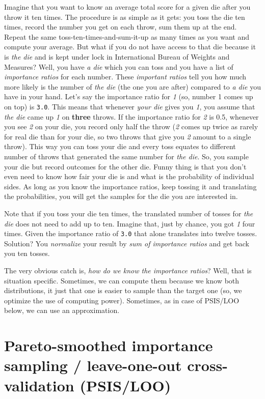\documentclass[
]{book}
\begin{document}
Imagine that you want to know an average total score for a given die after you throw it ten times. The procedure is as simple as it gets: you toss the die ten times, record the number you get on each throw, sum them up at the end. Repeat the same toss-ten-times-and-sum-it-up as many times as you want and compute your average. But what if you do not have access to that die because it is \emph{the die} and is kept under lock in International Bureau of Weights and Measures? Well, you have \emph{a die} which you can toss and you have a list of \emph{importance ratios} for each number. These \emph{important ratios} tell you how much more likely is the number of \emph{the die} (the one you are after) compared to \emph{a die} you have in your hand. Let's say the importance ratio for \emph{1} (so, number 1 comes up on top) is \texttt{3.0}. This means that whenever \emph{your die} gives you \emph{1}, you assume that \emph{the die} came up \emph{1} on \textbf{three} throws. If the importance ratio for \emph{2} is 0.5, whenever you see \emph{2} on your die, you record only half the throw (\emph{2} comes up twice as rarely for real die than for your die, so two throws that give you \emph{2} amount to a single throw). This way you can toss your die and every toss equates to different number of throws that generated the same number for \emph{the die}. So, you sample your die but record outcomes for the other die. Funny thing is that you don't even need to know how fair your die is and what is the probability of individual sides. As long as you know the importance ratios, keep tossing it and translating the probabilities, you will get the samples for the die you are interested in.

Note that if you toss your die ten times, the translated number of tosses for \emph{the die} does not need to add up to ten. Imagine that, just by chance, you got \emph{1} four times. Given the importance ratio of \texttt{3.0} that alone translates into twelve tosses. Solution? You \emph{normalize} your result by \emph{sum of importance ratios} and get back you ten tosses.

The very obvious catch is, \emph{how do we know the importance ratios}? Well, that is situation specific. Sometimes, we can compute them because we know both distributions, it just that one is easier to sample than the target one (so, we optimize the use of computing power). Sometimes, as in case of PSIS/LOO below, we can use an approximation.

\hypertarget{pareto-smoothed-importance-sampling-leave-one-out-cross-validation-psisloo}{%
\section{Pareto-smoothed importance sampling / leave-one-out cross-validation (PSIS/LOO)}\label{pareto-smoothed-importance-sampling-leave-one-out-cross-validation-psisloo}}
\end{document}
